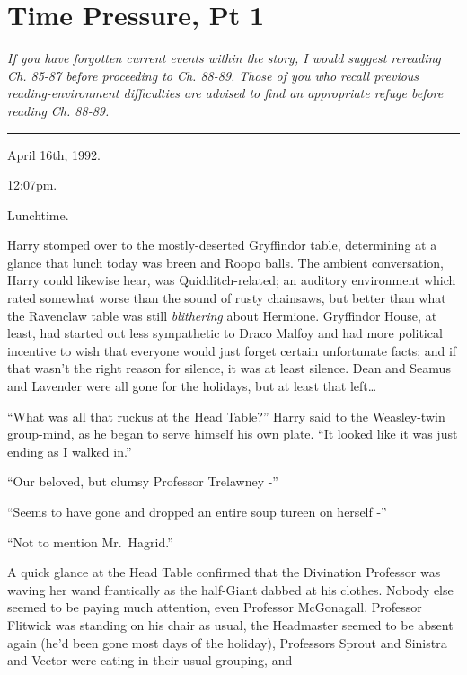 \chapter{Time Pressure, Pt 1}

\emph{If you have forgotten current events within the story, I would
suggest rereading Ch. 85-87 before proceeding to Ch. 88-89.} \emph{Those
of you who recall previous reading-environment difficulties are advised
to find an appropriate refuge before reading Ch. 88-89.}

\begin{center}\rule{3in}{0.4pt}\end{center}

April 16th, 1992.

12:07pm.

Lunchtime.

Harry stomped over to the mostly-deserted Gryffindor table, determining
at a glance that lunch today was breen and Roopo balls. The ambient
conversation, Harry could likewise hear, was Quidditch-related; an
auditory environment which rated somewhat worse than the sound of rusty
chainsaws, but better than what the Ravenclaw table was still
\emph{blithering} about Hermione. Gryffindor House, at least, had
started out less sympathetic to Draco Malfoy and had more political
incentive to wish that everyone would just forget certain unfortunate
facts; and if that wasn't the right reason for silence, it was at least
silence. Dean and Seamus and Lavender were all gone for the holidays,
but at least that left\ldots{}

``What was all that ruckus at the Head Table?'' Harry said to the
Weasley-twin group-mind, as he began to serve himself his own plate.
``It looked like it was just ending as I walked in.''

``Our beloved, but clumsy Professor Trelawney -''

``Seems to have gone and dropped an entire soup tureen on herself -''

``Not to mention Mr.~Hagrid.''

A quick glance at the Head Table confirmed that the Divination Professor
was waving her wand frantically as the half-Giant dabbed at his clothes.
Nobody else seemed to be paying much attention, even Professor
McGonagall. Professor Flitwick was standing on his chair as usual, the
Headmaster seemed to be absent again (he'd been gone most days of the
holiday), Professors Sprout and Sinistra and Vector were eating in their
usual grouping, and -

